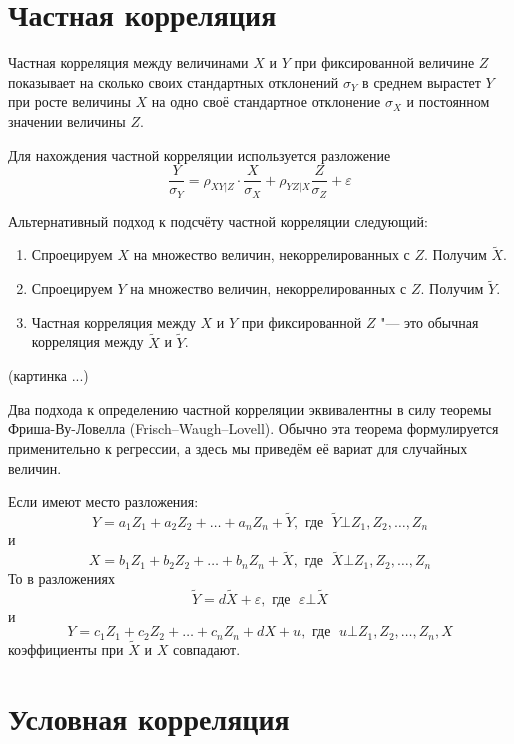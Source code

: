 \documentclass[10pt]{article}
\begin{document}
\section{Частная корреляция}

\begin{definition}
Частная корреляция между величинами $X$ и $Y$ при фиксированной величине $Z$ показывает на сколько своих стандартных отклонений $\sigma_Y$ в среднем вырастет $Y$ при росте величины $X$ на одно своё стандартное отклонение $\sigma_X$ и постоянном значении величины $Z$.
\end{definition}

Для нахождения частной корреляции используется разложение
\[
\frac{Y}{\sigma_Y}=\rho_{XY|Z} \cdot \frac{X}{\sigma_X} + \rho_{YZ|X} \frac{Z}{\sigma_Z} + \varepsilon
\]


Альтернативный подход к подсчёту частной корреляции следующий:
\begin{enumerate}
\item Спроецируем $X$ на множество величин, некоррелированных с $Z$. Получим $\tilde{X}$.
\item Спроецируем $Y$ на множество величин, некоррелированных с $Z$. Получим $\tilde{Y}$.
\item Частная корреляция между $X$ и $Y$ при фиксированной $Z$ "--- это обычная корреляция между $\tilde{X}$ и $\tilde{Y}$.
\end{enumerate}


(картинка ...)


Два подхода к определению частной корреляции эквивалентны в силу теоремы Фриша-Ву-Ловелла (Frisch–Waugh–Lovell). Обычно эта теорема формулируется применительно к регрессии, а здесь мы приведём её вариат для случайных величин.

\begin{theorem}
Если имеют место разложения:
\[
Y=a_1 Z_1 + a_2 Z_2 + \ldots + a_n Z_n + \tilde{Y}, \text{ где }\; \tilde{Y}\bot Z_1, Z_2, \ldots, Z_n
\]
и
\[
X=b_1 Z_1 + b_2 Z_2 + \ldots + b_n Z_n  + \tilde{X}, \text{ где }\; \tilde{X}\bot Z_1, Z_2, \ldots, Z_n
\]
То в разложениях  
\[
\tilde{Y}=d \tilde{X} + \varepsilon, \text{ где }\; \varepsilon \bot \tilde{X}
\]
и
\[
Y=c_1 Z_1 + c_2 Z_2 + \ldots + c_n Z_n  + dX + u, \text{ где }\; u \bot Z_1, Z_2, \ldots, Z_n, X
\]
коэффициенты при $\tilde{X}$ и $X$ совпадают.
\end{theorem}



\section{Условная корреляция}
\end{document}

